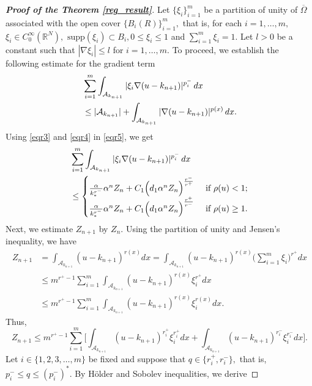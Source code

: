 \documentclass[11pt]{article}
\newcommand{\R}{\mathbb{R}}
\newcommand{\A}{\mathcal{A}_{k_{n+1}}}
\newcommand{\al} {\alpha}
\newcommand{\om} {\Omega}
\newcommand{\na} {\nabla}
\newcommand{\oline} {\overline}
\begin{document}
\begin{proof}[\bf Proof of the Theorem \ref{reg_result}]
Let $\{\xi_i\}_{i=1}^m$
be a partition of unity of $\oline\om$
associated with the open cover $\{B_i(R)\}_{i=1}^m,$
that is, for each $i=1,\dots,m,$
$\xi_i\in C_0^\infty(\R^N),$
$\text{supp}(\xi_i)\subset B_i, 0\le \xi_i\le 1$
and $ \sum_{i=1}^m\xi_i=1.$
Let $l>0$
be a constant such that $|\na\xi_i|\le l$
for $i=1,\dots,m.$
To proceed, we establish the following 
estimate for the gradient term
\begin{align}
\label{eqr5}
&
   \sum_{i=1}^m 
\int_{\mathcal{A}_{k_{n+1}}} 
|\xi_i\nabla (u-k_{n+1})|^{p_i^-} \, dx \\
\notag
& \le |\A|+
\int_{\mathcal{A}_{k_{n+1}}} 
|\nabla (u-k_{n+1})|^{p(x)} \, dx . 
\end{align}
Using \eqref{eqr3} and \eqref{eqr4} 
in \eqref{eqr5}, we get
\begin{align}
\label{eqr6}
&
   \sum_{i=1}^m 
\int_{\mathcal{A}_{k_{n+1}}} 
|\xi_i\nabla (u-k_{n+1})|^{p_i^-}
 \, dx \\ \notag
 &
 \le \begin{cases}
\frac{\al}{k_*^{r^-}}\al^nZ_n+C_1
\Big ( d_1\al^nZ_n\Big )^{
\frac{r^-}{r^+}} &\text{ if } \rho(u)<1;\\
   \frac{\al}{k_*^{r^-}}\al^nZ_n+C_1
   \Big ( d_1\al^nZ_n\Big )^{
\frac{r^+}{r^-}} &\text{ if }
 \rho(u)\ge1. 
\end{cases} 
\end{align}
Next, we estimate $Z_{n+1}$
by $Z_n.$
Using the partition of unity and Jensen's
 inequality, we have
\begin{equation*}
    \begin{aligned}
Z_{n+1} & =
\int_{\A}
  (u-k_{n+1}
  )^{r(x)} d x=
\int_{\A}
  (u-k_{n+1}
  )^{r(x)}
\Big (\sum_{i=1}^{m} \xi_{i}
\Big )^{r^{+}} dx \\
& \leq m^{r^{+}-1} \sum_{i=1}^{m} 
\int_{\A}
\left (u-k_{n+1}
\right )^{r(x)} \xi_{i}^{r^{+}} dx \\
& \leq m^{r^{+}-1} \sum_{i=1}^{m} 
\int_{\A}
\left (u-k_{n+1}
\right )^{r(x)} \xi_{i}^{r(x)} dx.
\end{aligned}
\end{equation*}
Thus,
\begin{equation}\label{eqr7}
Z_{n+1}\leq m^{r^{+}-1} \sum_{i=1}^{m} 
\Big [
\int_{\A}
  (u-k_{n+1}
  )^{r_i^+} \xi_{i}^{r_i^+} dx+
\int_{\A}
  (u-k_{n+1}
  )^{r_i^-} \xi_{i}^{r_i^-} dx
  \Big].
\end{equation}
Let $i\in\{1,2,3,\dots,m\}$
be fixed and suppose that $q\in\{r_i^+,r_i^-\},$
that is, $p_i^-\le q\le (p_i^-)^*.$
By H\"older and Sobolev inequalities, we derive

\end{proof}
\end{document}
